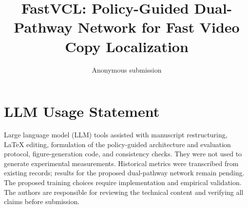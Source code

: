 \documentclass[10pt,twocolumn,letterpaper]{article}
\title{FastVCL: Policy-Guided Dual-Pathway Network for Fast Video Copy Localization}
\author{Anonymous submission}
\begin{document}
\maketitle







\label{page:body-end}

\clearpage
\label{page:references-start}
{
    \small
    
    
}


\clearpage
\section*{LLM Usage Statement}
Large language model (LLM) tools assisted with manuscript restructuring,
\LaTeX{} editing, formulation of the policy-guided architecture and evaluation
protocol, figure-generation code, and consistency checks. They were not used to
generate experimental measurements. Historical metrics were transcribed from
existing records; results for the proposed dual-pathway network remain pending.
The proposed training choices require implementation and empirical validation.
The authors are responsible for reviewing the technical content and verifying
all claims before submission.
\end{document}
